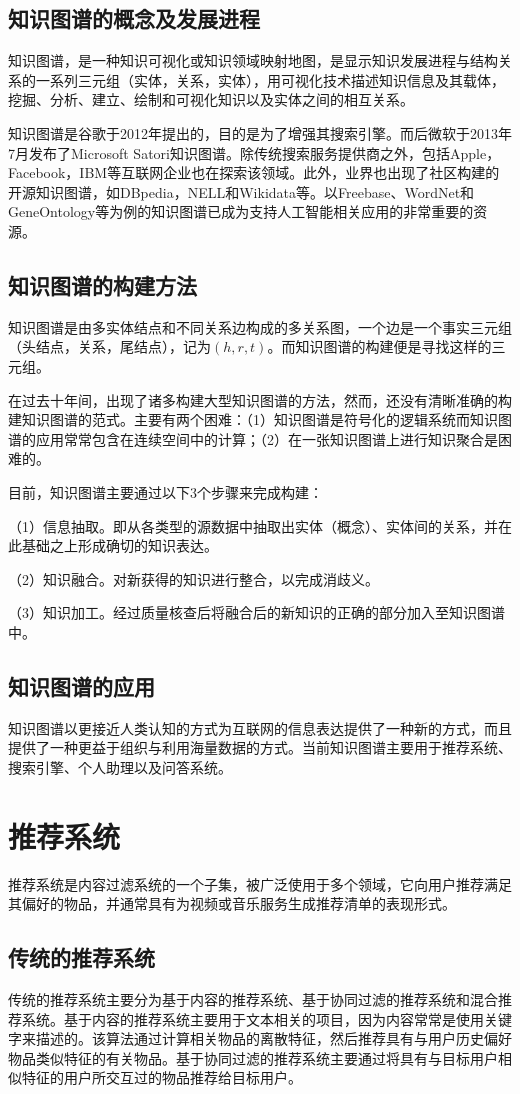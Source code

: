 \documentclass{bjfuthesis}
\begin{document}
\subsection{知识图谱的概念及发展进程}
知识图谱，是一种知识可视化或知识领域映射地图，是显示知识发展进程与结构关系的一系列三元组（实体，关系，实体），用可视化技术描述知识信息及其载体，挖掘、分析、建立、绘制和可视化知识以及实体之间的相互关系。

知识图谱是谷歌于2012年提出的，目的是为了增强其搜索引擎。而后微软于2013年7月发布了Microsoft Satori知识图谱。除传统搜索服务提供商之外，包括Apple，Facebook，IBM等互联网企业也在探索该领域。此外，业界也出现了社区构建的开源知识图谱，如DBpedia，NELL和Wikidata等。以Freebase、WordNet和GeneOntology等为例的知识图谱已成为支持人工智能相关应用的非常重要的资源。
\subsection{知识图谱的构建方法}
知识图谱是由多实体结点和不同关系边构成的多关系图，一个边是一个事实三元组（头结点，关系，尾结点），记为$(h,r,t)$。而知识图谱的构建便是寻找这样的三元组。

在过去十年间，出现了诸多构建大型知识图谱的方法，然而，还没有清晰准确的构建知识图谱的范式。主要有两个困难：（1）知识图谱是符号化的逻辑系统而知识图谱的应用常常包含在连续空间中的计算；（2）在一张知识图谱上进行知识聚合是困难的。

目前，知识图谱主要通过以下3个步骤来完成构建：

（1）信息抽取。即从各类型的源数据中抽取出实体（概念）、实体间的关系，并在此基础之上形成确切的知识表达。

（2）知识融合。对新获得的知识进行整合，以完成消歧义。

（3）知识加工。经过质量核查后将融合后的新知识的正确的部分加入至知识图谱中。
\subsection{知识图谱的应用}
知识图谱以更接近人类认知的方式为互联网的信息表达提供了一种新的方式，而且提供了一种更益于组织与利用海量数据的方式。当前知识图谱主要用于推荐系统、搜索引擎、个人助理以及问答系统。
\section{推荐系统}
推荐系统是内容过滤系统的一个子集，被广泛使用于多个领域，它向用户推荐满足其偏好的物品，并通常具有为视频或音乐服务生成推荐清单的表现形式。
\subsection{传统的推荐系统}
传统的推荐系统主要分为基于内容的推荐系统、基于协同过滤的推荐系统和混合推荐系统\cite{黄立威2018基于深度学习的推荐系统研究综述}。基于内容的推荐系统主要用于文本相关的项目，因为内容常常是使用关键字来描述的。该算法通过计算相关物品的离散特征，然后推荐具有与用户历史偏好物品类似特征的有关物品。基于协同过滤的推荐系统主要通过将具有与目标用户相似特征的用户所交互过的物品推荐给目标用户。
\end{document}
